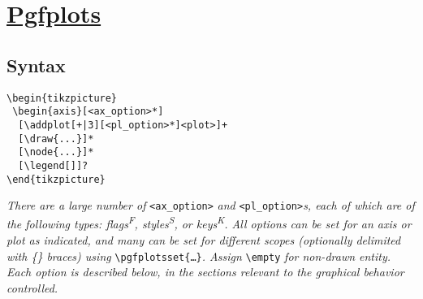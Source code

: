 \section{\href{http://mirrors.ctan.org/graphics/pgf/contrib/pgfplots/doc/pgfplots.pdf}{Pgfplots}}


\subsection*{Syntax}

\begin{minipage}{6.5cm}
\begin{lstlisting}
\begin{tikzpicture}
 \begin{axis}[<ax_option>*]
  [\addplot[+|3][<pl_option>*]<plot>]+
  [\draw{...}]*
  [\node{...}]*
  [\legend[]]?
\end{tikzpicture}
\end{lstlisting}
\end{minipage}

\textit{There are a large number of }\texttt{<ax\_option>}\textit{ and }\texttt{<pl\_option>}\textit{s, each of which are of the following types: {\color{blue}flags\textsuperscript{F}}, {\color{blue}styles\textsuperscript{S}}, or {\color{blue}keys}\textsuperscript{K}. All options can be set for an axis or plot as indicated, and many can be set for different scopes (optionally delimited with \{\} braces) using }\texttt{\textbackslash pgfplotsset\{\dots\}}\textit{. Assign } \texttt{\textbackslash empty} \textit{ for non-drawn entity. Each option is described below, in the sections relevant to the graphical behavior controlled.}\\




